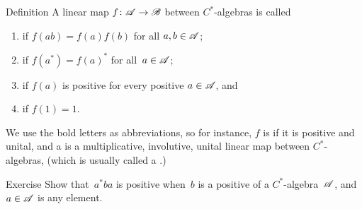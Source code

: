 \documentclass[main]{subfiles}
\begin{document}
%
%
\begin{parsec}
\begin{point}{Definition}
A linear map $f\colon \mathscr{A} \to \mathscr{B}$
between $C^*$-algebras
is called
\begin{enumerate}
\item
{}
if $f(ab)=f(a)f(b)$ for all $a,b\in\mathscr{A}$;
\item
{}
if $f(a^*)=f(a)^*$ for all~$a\in\mathscr{A}$;
\item
{}
if $f(a)$ is positive
for every positive $a\in\mathscr{A}$, and
\item
{}
if $f(1)=1$.
\end{enumerate}
\end{point}
\begin{point}%
We use the bold letters as abbreviations,
so for instance,
$f$ is  if it is positive and unital,
and a 
is a multiplicative, involutive, unital linear map between $C^*$-algebras,
(which is usually called a .)
\end{point}
\end{parsec}
%
%
%
\begin{parsec}[ad-monotone]%
\begin{point}{Exercise}%
Show that~$a^*ba$
is positive
when~$b$ is a positive of a $C^*$-algebra~$\mathscr{A}$,
and $a\in \mathscr{A}$ is any element.
\end{point}
\end{parsec}
\end{document}
